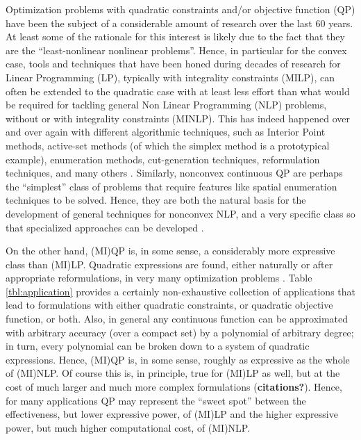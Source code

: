 Optimization problems with quadratic constraints and/or objective function (QP) have been the subject of a considerable amount of research over the last 60 years. At least some of the rationale for this interest is likely due to the fact that they are the ``least-nonlinear nonlinear problems''. Hence, in particular for the convex case, tools and techniques that have been honed during decades of research for Linear Programming (LP), typically with integrality constraints (MILP), can often be extended to the quadratic case with at least less effort than what would be required for tackling general Non Linear Programming (NLP) problems, without or with integrality constraints (MINLP). This has indeed happened over and over again with different algorithmic techniques, such as Interior Point methods, active-set methods (of which the simplex method is a prototypical example), enumeration methods, cut-generation techniques, reformulation techniques, and many others . Similarly, nonconvex continuous QP are perhaps the ``simplest'' class of problems that require features like spatial enumeration techniques to be solved.  Hence, they are both the natural basis for the development of general techniques for nonconvex NLP, and a very specific class so that specialized approaches can be developed \cite{Dur2010,Burer2012}.

On the other hand, (MI)QP is, in some sense, a considerably more expressive class than (MI)LP. Quadratic expressions are found, either naturally or after appropriate reformulations, in very many optimization problems \cite{Kochenberger2014}. Table \ref{tbl:application} provides a certainly non-exhaustive collection of applications that lead to formulations with either quadratic constraints, or quadratic objective function, or both. Also, in general any continuous function can be approximated with arbitrary accuracy (over a compact set) by a polynomial of arbitrary degree; in turn, every polynomial can be broken down to a system of quadratic expressions. Hence, (MI)QP is, in some sense, roughly as expressive as the whole of (MI)NLP. Of course this is, in principle, true for (MI)LP as well, but at the cost of much larger and much more complex formulations ({\bf citations?}). Hence, for many applications QP may represent the ``sweet spot'' between the effectiveness, but lower expressive power, of (MI)LP and the higher expressive power, but much higher computational cost, of (MI)NLP.

